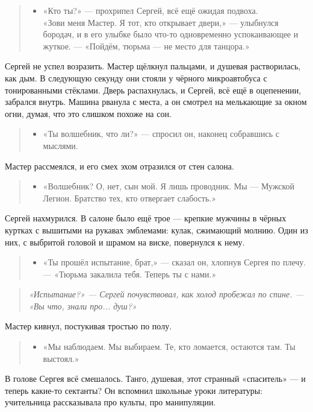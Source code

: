 \documentclass[12pt,a4paper]{book}
\newenvironment{dialogue}{\begin{quote}\itshape\begin{itemize}\item[]}{\end{itemize}\end{quote}}
\newenvironment{innerthought}{\begin{quote}\small\itshape}{\end{quote}}
\begin{document}
\begin{dialogue}
«Кто ты?» --- прохрипел Сергей, всё ещё ожидая подвоха. \\
«Зови меня Мастер. Я тот, кто открывает двери,» --- улыбнулся бородач, и в его улыбке было что-то одновременно успокаивающее и жуткое. --- «Пойдём, тюрьма --- не место для танцора.»
\end{dialogue}

Сергей не успел возразить. Мастер щёлкнул пальцами, и душевая растворилась, как дым. В следующую секунду они стояли у чёрного микроавтобуса с тонированными стёклами. Дверь распахнулась, и Сергей, всё ещё в оцепенении, забрался внутрь. Машина рванула с места, а он смотрел на мелькающие за окном огни, думая, что это слишком похоже на сон.

\begin{dialogue}
«Ты волшебник, что ли?» --- спросил он, наконец собравшись с мыслями. \\
\end{dialogue}

Мастер рассмеялся, и его смех эхом отразился от стен салона.

\begin{dialogue}
«Волшебник? О, нет, сын мой. Я лишь проводник. Мы --- Мужской Легион. Братство тех, кто отвергает слабость.»
\end{dialogue}

Сергей нахмурился. В салоне было ещё трое --- крепкие мужчины в чёрных куртках с вышитыми на рукавах эмблемами: кулак, сжимающий молнию. Один из них, с выбритой головой и шрамом на виске, повернулся к нему.

\begin{dialogue}
«Ты прошёл испытание, брат,» --- сказал он, хлопнув Сергея по плечу. --- «Тюрьма закалила тебя. Теперь ты с нами.»
\end{dialogue}

\begin{innerthought}
«Испытание?» --- Сергей почувствовал, как холод пробежал по спине. --- «Вы что, знали про... душ?»
\end{innerthought}

Мастер кивнул, постукивая тростью по полу.

\begin{dialogue}
«Мы наблюдаем. Мы выбираем. Те, кто ломается, остаются там. Ты выстоял.»
\end{dialogue}

В голове Сергея всё смешалось. Танго, душевая, этот странный «спаситель» --- и теперь какие-то сектанты? Он вспомнил школьные уроки литературы: учительница рассказывала про культы, про манипуляции.
\end{document}
